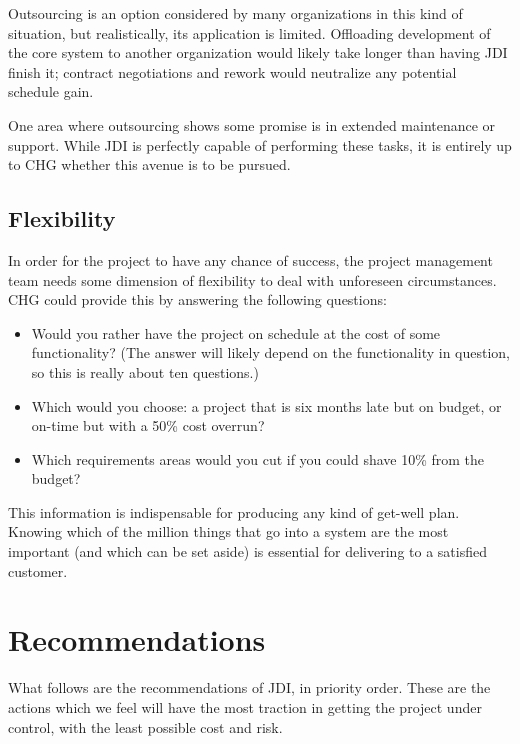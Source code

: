 \documentclass[12pt]{article}
\begin{document}
Outsourcing is an option considered by many organizations in this kind of situation, but
realistically, its application is limited.  Offloading development of the core system to another
organization would likely take longer than having JDI finish it; contract negotiations and rework
would neutralize any potential schedule gain.

One area where outsourcing shows some promise is in extended maintenance or support.  While JDI is
perfectly capable of performing these tasks, it is entirely up to CHG whether this avenue is to be
pursued.

\subsection{Flexibility}
In order for the project to have any chance of success, the project management team needs some
dimension of flexibility to deal with unforeseen circumstances.  CHG could provide this by answering
the following questions:

\begin{itemize}
\item Would you rather have the project on schedule at the cost of some functionality?  (The answer
  will likely depend on the functionality in question, so this is really about ten questions.)
\item Which would you choose: a project that is six months late but on budget, or on-time but with a
  50\% cost overrun?
\item Which requirements areas would you cut if you could shave 10\% from the budget?
\end{itemize}

This information is indispensable for producing any kind of get-well plan.  Knowing which of the
million things that go into a system are the most important (and which can be set aside) is
essential for delivering to a satisfied customer.


\clearpage
\section{Recommendations}
What follows are the recommendations of JDI, in priority order.  These are the actions which we feel
will have the most traction in getting the project under control, with the least possible cost and
risk.
\end{document}
